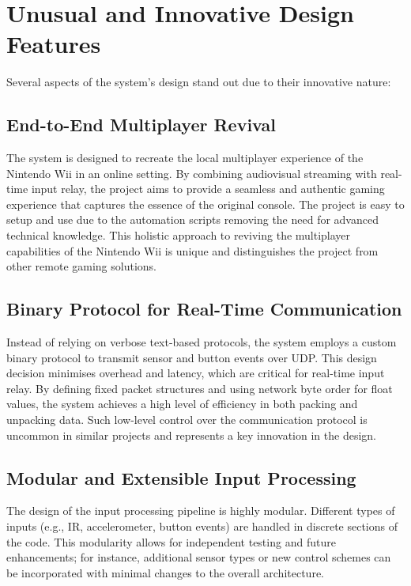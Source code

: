 \section{Unusual and Innovative Design Features}

Several aspects of the system’s design stand out due to their innovative nature:

\subsection*{End-to-End Multiplayer Revival}

The system is designed to recreate the local multiplayer experience of the Nintendo Wii in an online setting. By combining audiovisual streaming with real-time input relay, the project aims to provide a seamless and authentic gaming experience that captures the essence of the original console. The project is easy to setup and use due to the automation scripts removing the need for advanced technical knowledge. This holistic approach to reviving the multiplayer capabilities of the Nintendo Wii is unique and distinguishes the project from other remote gaming solutions.


\subsection*{Binary Protocol for Real-Time Communication}

Instead of relying on verbose text-based protocols, the system employs a custom binary protocol to transmit sensor and button events over UDP. This design decision minimises overhead and latency, which are critical for real-time input relay. By defining fixed packet structures and using network byte order for float values, the system achieves a high level of efficiency in both packing and unpacking data. Such low-level control over the communication protocol is uncommon in similar projects and represents a key innovation in the design.

\subsection*{Modular and Extensible Input Processing}

The design of the input processing pipeline is highly modular. Different types of inputs (e.g., IR, accelerometer, button events) are handled in discrete sections of the code. This modularity allows for independent testing and future enhancements; for instance, additional sensor types or new control schemes can be incorporated with minimal changes to the overall architecture.


